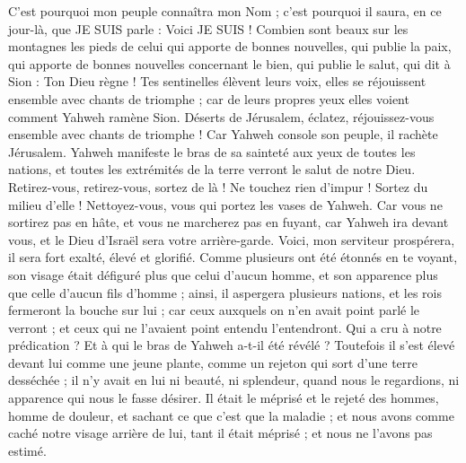 \begin{multicols}{2}
C'est pourquoi mon peuple connaîtra mon Nom ; c'est pourquoi il saura, en ce jour-là, que JE SUIS parle : Voici JE SUIS !
Combien sont beaux sur les montagnes les pieds de celui qui apporte de bonnes nouvelles, qui publie la paix, qui apporte de bonnes nouvelles concernant le bien, qui publie le salut, qui dit à Sion : Ton Dieu règne !
Tes sentinelles élèvent leurs voix, elles se réjouissent ensemble avec chants de triomphe ; car de leurs propres yeux elles voient comment Yahweh ramène Sion.
Déserts de Jérusalem, éclatez, réjouissez-vous ensemble avec chants de triomphe ! Car Yahweh console son peuple, il rachète Jérusalem.
Yahweh manifeste le bras de sa sainteté aux yeux de toutes les nations, et toutes les extrémités de la terre verront le salut de notre Dieu.
Retirez-vous, retirez-vous, sortez de là ! Ne touchez rien d'impur ! Sortez du milieu d'elle ! Nettoyez-vous, vous qui portez les vases de Yahweh.
Car vous ne sortirez pas en hâte, et vous ne marcherez pas en fuyant, car Yahweh ira devant vous, et le Dieu d'Israël sera votre arrière-garde.
Voici, mon serviteur prospérera, il sera fort exalté, élevé et glorifié.
Comme plusieurs ont été étonnés en te voyant, son visage était défiguré plus que celui d'aucun homme, et son apparence plus que celle d'aucun fils d'homme ;
ainsi, il aspergera plusieurs nations, et les rois fermeront la bouche sur lui ; car ceux auxquels on n'en avait point parlé le verront ; et ceux qui ne l'avaient point entendu l'entendront.
\VerseOne{}Qui a cru à notre prédication ? Et à qui le bras de Yahweh a-t-il été révélé ?
Toutefois il s'est élevé devant lui comme une jeune plante, comme un rejeton qui sort d'une terre desséchée ; il n'y avait en lui ni beauté, ni splendeur, quand nous le regardions, ni apparence qui nous le fasse désirer.
Il était le méprisé et le rejeté des hommes, homme de douleur, et sachant ce que c'est que la maladie ; et nous avons comme caché notre visage arrière de lui, tant il était méprisé ; et nous ne l'avons pas estimé.

\end{multicols}
